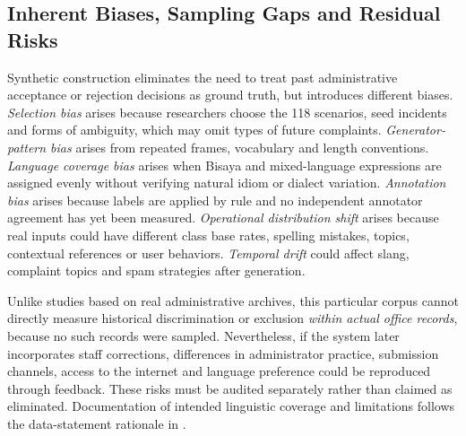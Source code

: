 \subsection{Inherent Biases, Sampling Gaps and Residual Risks}
Synthetic construction eliminates the need to treat past administrative acceptance or rejection decisions as ground truth, but introduces different biases. \emph{Selection bias} arises because researchers choose the 118 scenarios, seed incidents and forms of ambiguity, which may omit types of future complaints. \emph{Generator-pattern bias} arises from repeated frames, vocabulary and length conventions. \emph{Language coverage bias} arises when Bisaya and mixed-language expressions are assigned evenly without verifying natural idiom or dialect variation. \emph{Annotation bias} arises because labels are applied by rule and no independent annotator agreement has yet been measured. \emph{Operational distribution shift} arises because real inputs could have different class base rates, spelling mistakes, topics, contextual references or user behaviors. \emph{Temporal drift} could affect slang, complaint topics and spam strategies after generation.

Unlike studies based on real administrative archives, this particular corpus cannot directly measure historical discrimination or exclusion \emph{within actual office records}, because no such records were sampled. Nevertheless, if the system later incorporates staff corrections, differences in administrator practice, submission channels, access to the internet and language preference could be reproduced through feedback. These risks must be audited separately rather than claimed as eliminated. Documentation of intended linguistic coverage and limitations follows the data-statement rationale in \cite{benderfriedman}.

